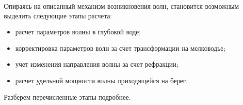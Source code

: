 Опираясь на описанный механизм возникновения волн, становится возможным выделить следующие этапы расчета:
\begin{itemize}
    \item расчет параметров волны в глубокой воде;
    \item корректировка параметров волн за счет трансформации на мелководье;
    \item учет изменения направления волны за счет рефракции;
    \item расчет удельной мощности волны приходящейся на берег.
\end{itemize}

Разберем перечисленные этапы подробнее.







